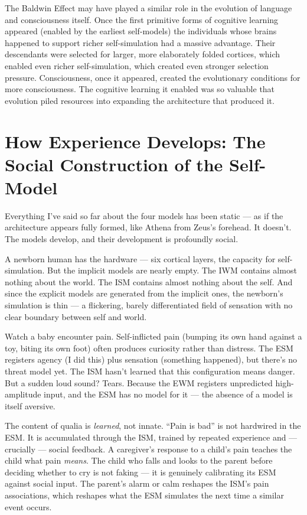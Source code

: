 \documentclass[11pt, twoside, openright]{book}
\begin{document}
The Baldwin Effect may have played a similar role in the evolution of language and consciousness itself. Once the first primitive forms of cognitive learning appeared (enabled by the earliest self-models) the individuals whose brains happened to support richer self-simulation had a massive advantage. Their descendants were selected for larger, more elaborately folded cortices, which enabled even richer self-simulation, which created even stronger selection pressure. Consciousness, once it appeared, created the evolutionary conditions for more consciousness. The cognitive learning it enabled was so valuable that evolution piled resources into expanding the architecture that produced it.

\section*{How Experience Develops: The Social Construction of the Self-Model}

Everything I've said so far about the four models has been static --- as if the architecture appears fully formed, like Athena from Zeus's forehead. It doesn't. The models develop, and their development is profoundly social.

A newborn human has the hardware --- six cortical layers, the capacity for self-simulation. But the implicit models are nearly empty. The IWM contains almost nothing about the world. The ISM contains almost nothing about the self. And since the explicit models are generated from the implicit ones, the newborn's simulation is thin --- a flickering, barely differentiated field of sensation with no clear boundary between self and world.

Watch a baby encounter pain. Self-inflicted pain (bumping its own hand against a toy, biting its own foot) often produces curiosity rather than distress. The ESM registers agency (I did this) plus sensation (something happened), but there's no threat model yet. The ISM hasn't learned that this configuration means danger. But a sudden loud sound? Tears. Because the EWM registers unpredicted high-amplitude input, and the ESM has no model for it --- the absence of a model is itself aversive.

The content of qualia is \textit{learned}, not innate. ``Pain is bad'' is not hardwired in the ESM. It is accumulated through the ISM, trained by repeated experience and --- crucially --- social feedback. A caregiver's response to a child's pain teaches the child what pain \textit{means}. The child who falls and looks to the parent before deciding whether to cry is not faking --- it is genuinely calibrating its ESM against social input. The parent's alarm or calm reshapes the ISM's pain associations, which reshapes what the ESM simulates the next time a similar event occurs.
\end{document}
